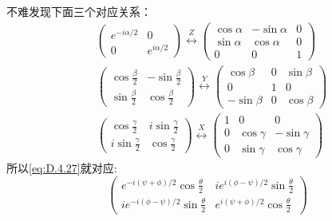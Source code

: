 不难发现下面三个对应关系：
\begin{equation}
	\begin{aligned}
		&\left( {\begin{array}{*{20}{c}}
				{{e^{ - i\alpha /2}}}&0 \\ 
				0&{{e^{i\alpha /2}}} 
		\end{array}} \right)\overset Z \longleftrightarrow \left( {\begin{array}{*{20}{c}}
				{\cos \alpha }&{ - \sin \alpha }&0 \\ 
				{\sin \alpha }&{\cos \alpha }&0 \\ 
				0&0&1 
		\end{array}} \right)\\
		&\left( {\begin{array}{*{20}{c}}
				{\cos \frac{\beta }{2}}&{ - \sin \frac{\beta }{2}} \\ 
				{\sin \frac{\beta }{2}}&{\cos \frac{\beta }{2}} 
		\end{array}} \right)\overset Y \longleftrightarrow \left( {\begin{array}{*{20}{c}}
				{\cos \beta }&0&{\sin \beta } \\ 
				0&1&0 \\ 
				{ - \sin \beta }&0&{\cos \beta } 
		\end{array}} \right)\\
		&\left( {\begin{array}{*{20}{c}}
				{\cos \frac{\gamma }{2}}&{i\sin \frac{\gamma }{2}} \\ 
				{i\sin \frac{\gamma }{2}}&{\cos \frac{\gamma }{2}} 
		\end{array}} \right)\overset X \longleftrightarrow \left( {\begin{array}{*{20}{c}}
				1&0&0 \\ 
				0&{\cos \gamma }&{ - \sin \gamma } \\ 
				0&{\sin \gamma }&{\cos \gamma } 
		\end{array}} \right)
	\end{aligned}
\end{equation}
所以\ref{eq:D.4.27}就对应:
\[\left( {\begin{array}{*{20}{c}}
		{{e^{ - i\left( {\psi  + \phi } \right)/2}}\cos \frac{\theta }{2}}&{i{e^{i\left( {\phi  - \psi } \right)/2}}\sin \frac{\theta }{2}} \\ 
		{i{e^{ - i\left( {\phi  - \psi } \right)/2}}\sin \frac{\theta }{2}}&{{e^{i\left( {\psi  + \phi } \right)/2}}\cos \frac{\theta }{2}} 
\end{array}} \right)\]

